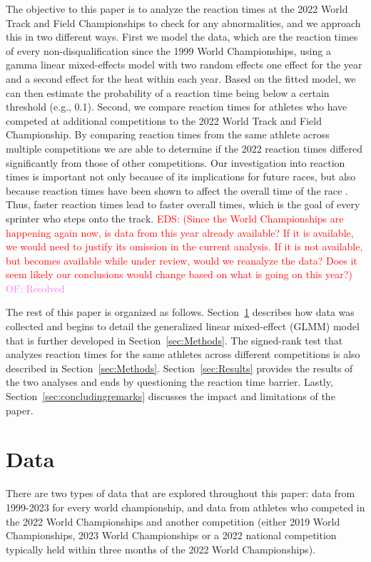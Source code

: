 \documentclass[12pt, letterpaper, titlepage]{article}
\newcommand{\eds}[1]{\textcolor{red}{EDS: (#1)}}
\newcommand{\of}[1]{\textcolor{violet}{OF: #1}}
\begin{document}
The objective to this paper is to analyze the reaction times at the 2022 World 
Track and Field Championships to check for any abnormalities, and we approach
this in two different ways.  First we model the data, which are
the reaction times of every non-disqualification since the 1999 World 
Championships, using a gamma linear mixed-effects model with two random effects 
one effect for the year and a second effect for the
heat within each year.
Based on the fitted model, we can then estimate the probability of a reaction 
time being below a certain threshold (e.g., 0.1). 
Second, we compare reaction times for athletes who have competed
at additional competitions to the 2022 World Track and Field Championship.  By
comparing reaction times from the same athlete across multiple competitions we 
are able to determine if the 2022 reaction times differed significantly from 
those of other competitions.
Our investigation into reaction times is important not only because of its
implications for future races, but also because reaction times have
been shown to affect the overall time of the race \citep{delalija2008reaction}.
Thus, faster reaction times lead to faster overall times, which is the goal of
every sprinter who steps onto the track.
\eds{Since the World Championships are happening again now, is data from this 
year already available? If it is available, we would need to justify its omission
in the current analysis.
If it is not available, but becomes available while under review, would we 
reanalyze the data?  Does it seem likely our conclusions would change based on
what is going on this year?}
\of{Resolved}


The rest of this paper is organized as follows. Section~\ref{sec:Data} describes 
how data was collected and begins to detail the generalized linear mixed-effect 
(GLMM) model that is further developed in Section~\ref{sec:Methods}. The 
signed-rank test that analyzes reaction times for the same athletes across
different competitions is
also described in Section~\ref{sec:Methods}.  Section~\ref{sec:Results}
 provides the results of the two analyses and ends 
by questioning the reaction time barrier.  Lastly, Section~\ref{sec:concludingremarks}
discusses the impact and limitations of the paper.


\section{Data} \label{sec:Data}

There are two types of data that are explored throughout this paper: data from
1999-2023 for every world championship, and data from athletes who competed in
the 2022 World Championships and another competition (either 2019 World 
Championships, 2023 World Championships or a 2022 national competition typically
held within three months of the 2022 World Championships). 
\end{document}
